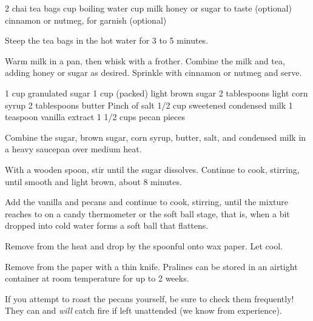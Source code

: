 \begin{ingreds}
  2 chai tea bags
   cup boiling water
   cup milk
  honey or sugar to taste (optional)
  cinnamon or nutmeg, for garnish (optional)
\end{ingreds}
\begin{method}
  Steep the tea bags in the hot water
  for 3 to 5 minutes.

  Warm milk in a pan, then whisk with a frother.
  Combine the milk and tea,
  adding honey or sugar as desired.
  Sprinkle with cinnamon or nutmeg and serve.
\end{method}

\begin{ingreds}
  1 cup granulated sugar
  1 cup (packed) light brown sugar
  2 tablespoons light corn syrup
  2 tablespoons butter
  Pinch of salt
  1/2 cup sweetened condensed milk
  1 teaspoon vanilla extract
  1 1/2 cups pecan pieces
\end{ingreds}
\begin{method}
  Combine the sugar, brown sugar, corn syrup, butter, salt,
  and condensed milk in a heavy saucepan over medium heat.

  With a wooden spoon, stir until the sugar dissolves.
  Continue to cook, stirring, until smooth and light brown,
  about 8 minutes.

  Add the vanilla and pecans and continue to cook,
  stirring, until the mixture reaches  to
   on a candy thermometer or the soft ball stage,
  that is, when a bit dropped into cold water
  forms a soft ball that flattens.

  Remove from the heat and drop by the spoonful onto wax paper.
  Let cool.

  Remove from the paper with a thin knife.
  Pralines can be stored in an airtight container
  at room temperature for up to 2 weeks.
\end{method}
\begin{tips}
  If you attempt to roast the pecans yourself,
  be sure to check them frequently!
  They can and \emph{will} catch fire if left unattended
  (we know from experience).
\end{tips}


